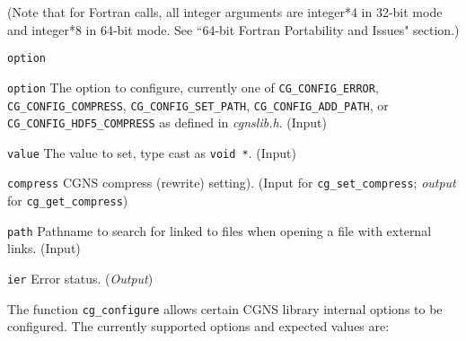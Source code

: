 \noindent (Note that for Fortran calls, all integer arguments are integer*4 in 32-bit mode and integer*8 in 64-bit mode.
See ``64-bit Fortran Portability and Issues" section.)

\begin{Ventryi}{\texttt{option}}\raggedright
\item [\texttt{option}]
      The option to configure, currently one of
      \texttt{CG\_CONFIG\_ERROR}, \texttt{CG\_CONFIG\_COMPRESS},
      \texttt{CG\_CONFIG\_SET\_PATH}, \texttt{CG\_CONFIG\_ADD\_PATH},
      or \texttt{CG\_CONFIG\_HDF5\_COMPRESS}
      as defined in \textit{cgnslib.h}.
      (\textcolor{input}{Input})
\item [\texttt{value}]
      The value to set, type cast as \texttt{void *}.
      (\textcolor{input}{Input})
\item [\texttt{compress}]
      CGNS compress (rewrite) setting).
      (\textcolor{input}{Input} for \texttt{cg\_set\_compress}; \textcolor{output}{\textit{output}} for
      \texttt{cg\_get\_compress})
\item [\texttt{path}]
      Pathname to search for linked to files when opening a file with external links.
      (\textcolor{input}{Input})
\item [\texttt{ier}]
      Error status.
      (\textcolor{output}{\textit{Output}})
\end{Ventryi}

The function \texttt{cg\_configure} allows certain CGNS library internal
options to be configured.
The currently supported options and expected values are:

